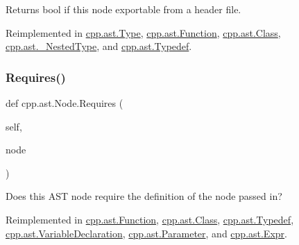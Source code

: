 \begin{DoxyVerb}Returns bool if this node exportable from a header file.\end{DoxyVerb}
 

Reimplemented in \mbox{\hyperlink{classcpp_1_1ast_1_1_type_a80dce781581c03e550ce51a9a33ca158}{cpp.\+ast.\+Type}}, \mbox{\hyperlink{classcpp_1_1ast_1_1_function_a85a073cd69116bc6191f379d69d10d72}{cpp.\+ast.\+Function}}, \mbox{\hyperlink{classcpp_1_1ast_1_1_class_a1ab749f8cfddb0903c6484791f70f42e}{cpp.\+ast.\+Class}}, \mbox{\hyperlink{classcpp_1_1ast_1_1___nested_type_a689f8b0dc20e6070938825eee483dd2f}{cpp.\+ast.\+\_\+\+Nested\+Type}}, and \mbox{\hyperlink{classcpp_1_1ast_1_1_typedef_adee58e4674b049d8e4435b5b6ad8e1d4}{cpp.\+ast.\+Typedef}}.

\mbox{\label{classcpp_1_1ast_1_1_node_a31ae211f954a8c578ef16226df5ac8c8}} 
\subsubsection{\texorpdfstring{Requires()}{Requires()}}
{\footnotesize\ttfamily def cpp.\+ast.\+Node.\+Requires (\begin{DoxyParamCaption}\item[{}]{self,  }\item[{}]{node }\end{DoxyParamCaption})}

\begin{DoxyVerb}Does this AST node require the definition of the node passed in?\end{DoxyVerb}
 

Reimplemented in \mbox{\hyperlink{classcpp_1_1ast_1_1_function_a999e7b5e43517cd4d68b1aeea8a7d6e1}{cpp.\+ast.\+Function}}, \mbox{\hyperlink{classcpp_1_1ast_1_1_class_a347673e0a2a7b840b7d2d1cae13977f7}{cpp.\+ast.\+Class}}, \mbox{\hyperlink{classcpp_1_1ast_1_1_typedef_aa9f65f4a97ba340f2c9ebc5e7ce27e8c}{cpp.\+ast.\+Typedef}}, \mbox{\hyperlink{classcpp_1_1ast_1_1_variable_declaration_aaa1cae7cf191e6d561d861cd053a0bf4}{cpp.\+ast.\+Variable\+Declaration}}, \mbox{\hyperlink{classcpp_1_1ast_1_1_parameter_a4bc5c17a0d606d35be40cb4c2c1a67a6}{cpp.\+ast.\+Parameter}}, and \mbox{\hyperlink{classcpp_1_1ast_1_1_expr_a9c92416eb1285068f190dcda8fd33682}{cpp.\+ast.\+Expr}}.

\mbox{\label{classcpp_1_1ast_1_1_node_ab5dfeabcbcd7c1f5feb8522edffb8b4a}} 
